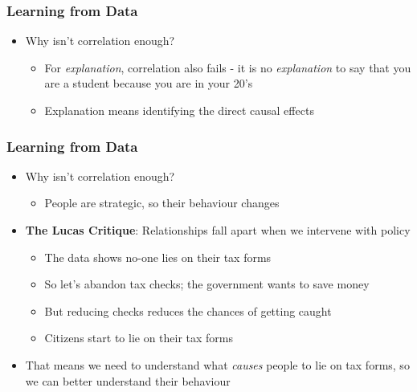 \documentclass[xcolor=x11names,compress]{beamer}\usepackage[]{graphicx}\usepackage[]{color}
\renewcommand{\(}{\begin{columns}}
\renewcommand{\)}{\end{columns}}
\newcommand{\<}[1]{\begin{column}{#1}}
\renewcommand{\>}{\end{column}}
\begin{document}
\begin{frame}
\frametitle{Learning from Data}
\begin{itemize}
\item Why isn't correlation enough?
\begin{itemize}
\item For \textit{explanation}, correlation also fails - it is no \textit{explanation} to say that you are a student because you are in your 20's
\item Explanation means identifying the direct causal effects
\end{itemize}
\end{itemize}
\end{frame}

\begin{frame}
\frametitle{Learning from Data}
\begin{itemize}
\item Why isn't correlation enough?
\begin{itemize}
\item People are strategic, so their behaviour changes
\end{itemize}
\item \textbf{The Lucas Critique}: Relationships fall apart when we intervene with policy
\begin{itemize}
\item The data shows no-one lies on their tax forms
\item So let's abandon tax checks; the government wants to save money
\item But reducing checks reduces the chances of getting caught
\item Citizens start to lie on their tax forms
\end{itemize}
\item That means we need to understand what \textit{causes} people to lie on tax forms, so we can better understand their behaviour
\end{itemize}
\end{frame}
\end{document}
